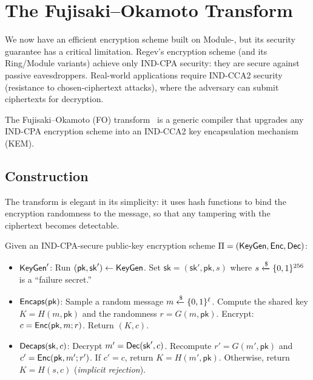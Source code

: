 \section{The Fujisaki--Okamoto Transform}
\label{sec:fo-transform}

We now have an efficient encryption scheme built on Module-\lwe{}, but its security guarantee has a critical limitation.  Regev's encryption scheme (and its Ring/Module variants) achieve only IND-CPA security: they are secure against passive eavesdroppers.  Real-world applications require IND-CCA2 security (resistance to chosen-ciphertext attacks), where the adversary can submit ciphertexts for decryption.

The Fujisaki--Okamoto (FO) transform~\cite{FujisakiOkamoto1999} is a generic compiler that upgrades any IND-CPA encryption scheme into an IND-CCA2 key encapsulation mechanism (KEM).

\subsection{Construction}
\label{subsec:fo-construction}

The transform is elegant in its simplicity: it uses hash functions to bind the encryption randomness to the message, so that any tampering with the ciphertext becomes detectable.

Given an IND-CPA-secure public-key encryption scheme $\Pi = (\mathsf{KeyGen}, \mathsf{Enc}, \mathsf{Dec})$:

\begin{definition}
\label{def:fo-kem}
\begin{itemize}
\item $\mathsf{KeyGen}'$: Run $(\mathsf{pk}, \mathsf{sk}') \leftarrow \mathsf{KeyGen}$.  Set $\mathsf{sk} = (\mathsf{sk}', \mathsf{pk}, s)$ where $s\getsr\{0,1\}^{256}$ is a ``failure secret.''
\item $\mathsf{Encaps}(\mathsf{pk})$: Sample a random message $m\getsr\{0,1\}^\ell$.  Compute the shared key $K = H(m, \mathsf{pk})$ and the randomness $r = G(m, \mathsf{pk})$.  Encrypt: $c = \mathsf{Enc}(\mathsf{pk}, m; r)$.  Return $(K, c)$.
\item $\mathsf{Decaps}(\mathsf{sk}, c)$: Decrypt $m' = \mathsf{Dec}(\mathsf{sk}', c)$.  Recompute $r' = G(m', \mathsf{pk})$ and $c' = \mathsf{Enc}(\mathsf{pk}, m'; r')$.  If $c' = c$, return $K = H(m', \mathsf{pk})$.  Otherwise, return $K = H(s, c)$ (\emph{implicit rejection}).
\end{itemize}
\end{definition}

